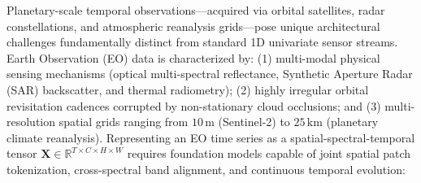 Planetary-scale temporal observations—acquired via orbital satellites, radar constellations, and atmospheric reanalysis grids—pose unique architectural challenges fundamentally distinct from standard 1D univariate sensor streams. Earth Observation (EO) data is characterized by: (1) multi-modal physical sensing mechanisms (optical multi-spectral reflectance, Synthetic Aperture Radar (SAR) backscatter, and thermal radiometry); (2) highly irregular orbital revisitation cadences corrupted by non-stationary cloud occlusions; and (3) multi-resolution spatial grids ranging from $10\,\text{m}$ (Sentinel-2) to $25\,\text{km}$ (planetary climate reanalysis). Representing an EO time series as a spatial-spectral-temporal tensor $\mathbf{X} \in \mathbb{R}^{T \times C \times H \times W}$ requires foundation models capable of joint spatial patch tokenization, cross-spectral band alignment, and continuous temporal evolution:
